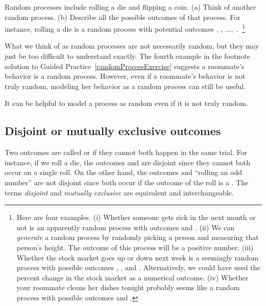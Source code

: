 \begin{exercise} \label{randomProcessExercise}
Random processes include rolling a die and flipping a coin. (a) Think of another random process. (b) Describe all the possible outcomes of that process. For instance, rolling a die is a random process with potential outcomes , , ...,~.~\footnote{Here are four examples. (i) Whether someone gets sick in the next month or not is an apparently random process with outcomes  and . (ii) We can \emph{generate} a random process by randomly picking a person and measuring that person's height. The outcome of this process will be a positive number. (iii) Whether the stock market goes up or down next week is a seemingly random process with possible outcomes , , and . Alternatively, we could have used the percent change in the stock market as a numerical outcome. (iv) Whether your roommate cleans her dishes tonight probably seems like a random process with possible outcomes  and .}
\end{exercise}

What we think of as random processes are not necessarily random, but they may just be too difficult to understand exactly. The fourth example in the footnote solution to Guided Practice~\ref{randomProcessExercise} suggests a roommate's behavior is a random process. However, even if a roommate's behavior is not truly random, modeling her behavior as a random process can still be useful.

\begin{tipBox}{
It can be helpful to model a process as random even if it is not truly random.}
\end{tipBox}


\subsection{Disjoint or mutually exclusive outcomes}


Two outcomes are called  or  if they cannot both happen in the same trial. For instance, if we roll a die, the outcomes  and  are disjoint since they cannot both occur on a single roll. On the other hand, the outcomes  and ``rolling an odd number'' are not disjoint since both occur if the outcome of the roll is a . The terms \emph{disjoint} and \emph{mutually exclusive} are equivalent and interchangeable.


